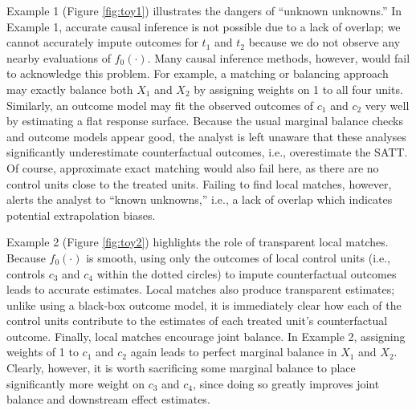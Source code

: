 \documentclass{article}
\begin{document}
Example 1 (Figure \ref{fig:toy1}) illustrates the dangers of ``unknown unknowns.''
In Example 1, accurate causal inference is not possible due to a lack of overlap; we cannot accurately impute outcomes for $t_1$ and $t_2$ because we do not observe any nearby evaluations of $f_0(\cdot)$.
Many causal inference methods, however, would fail to acknowledge this problem.
For example, a matching or balancing approach may exactly balance both $X_1$ and $X_2$ by assigning weights on 1 to all four units.
Similarly, an outcome model may fit the observed outcomes of $c_1$ and $c_2$ very well by estimating a flat response surface.
Because the usual marginal balance checks and outcome models appear good, the analyst is left unaware that these analyses significantly underestimate counterfactual outcomes, i.e., overestimate the SATT.
Of course, approximate exact matching would also fail here, as there are no control units close to the treated units.
Failing to find local matches, however, alerts the analyst to ``known unknowns,'' i.e., a lack of overlap which indicates potential extrapolation biases.

Example 2 (Figure \ref{fig:toy2}) highlights the role of transparent local matches.
Because $f_0(\cdot)$ is smooth, using only the outcomes of local control units (i.e., controls $c_3$ and $c_4$ within the dotted circles) to impute counterfactual outcomes leads to accurate estimates.
Local matches also produce transparent estimates;
unlike using a black-box outcome model, it is immediately clear how each of the control units contribute to the estimates of each treated unit's counterfactual outcome.
Finally, local matches encourage joint balance.
In Example 2, assigning weights of 1 to $c_1$ and $c_2$ again leads to perfect marginal balance in $X_1$ and $X_2$.
Clearly, however, it is worth sacrificing some marginal balance to place significantly more weight on $c_3$ and $c_4$, since doing so greatly improves joint balance and downstream effect estimates.

\end{document}
